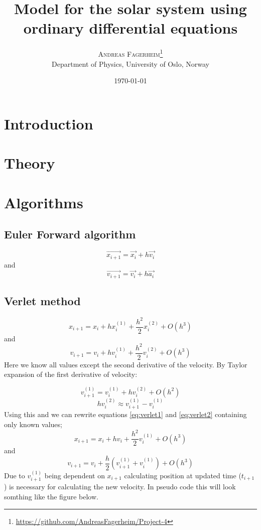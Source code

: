 \documentclass[twoside,twocolumn]{article}
\title{Model for the solar system using ordinary differential equations } %
\author{%
\textsc{Andreas Fagerheim}\thanks{\url{https://github.com/AndreasFagerheim/Project-4}} \\[1ex] %
\normalsize Department of Physics, University of Oslo, Norway \\ %
}
\date{\today} %
\begin{document}
\maketitle

\section{Introduction}


\section{Theory}


\section{Algorithms}
\subsection{Euler Forward algorithm}

\begin{equation}
\vec{  x_{i+1}} = \vec{x_{i}} + h \vec{v_i}
\end{equation}
and
\begin{equation}
\vec{  v_{i+1}} = \vec{v_{i}} + h \vec{a_i}
\end{equation}

\subsection{Verlet method}
\begin{equation}\label{eq:verlet1}
 x_{i+1} =x_{i}+ h x_{i}^{(1)} +\frac{h^2}{2} x_{i}^{(2)} + O(h^3)
\end{equation}
and
\begin{equation} \label{eq:verlet2}
v_{i+1} =v_{i}+ h v_{i}^{(1)}+\frac{h^2}{2} v_{i}^{(2)} + O(h^3)
\end{equation}
Here we know all values except the second derivative of the velocity. By Taylor expansion of the first derivative of velocity:

\[
v_{i+1}^{(1)} =v_{i}^{(1)}+ h v_{i}^{(2)} + O(h^2)
\] 
\[
hv_{i}^{(2)} \approx v_{i+1}^{(1)}-  v_{i}^{(1)}
\] 
Using this and we can rewrite equations \ref{eq:verlet1} and \ref{eq:verlet2} containing only known values;
\begin{equation}
x_{i+1} =x_{i}+ h v_{i} +\frac{h^2}{2} v_{i}^{(1)} + O(h^3)
\end{equation}
and
\begin{equation}
v_{i+1} =v_{i}+ \frac{h}{2} \left( v_{i+1}^{(1)}+v_{i}^{(1)} \right)+ O(h^3)
\end{equation}
Due to $v_{i+1}^{(1)}$ being dependent on $x_{i+1}$ calculating position at updated time ($t_{i+1}$) is necessary for calculating the new velocity. In pseudo code this will look somthing like the figure below.
\end{document}
